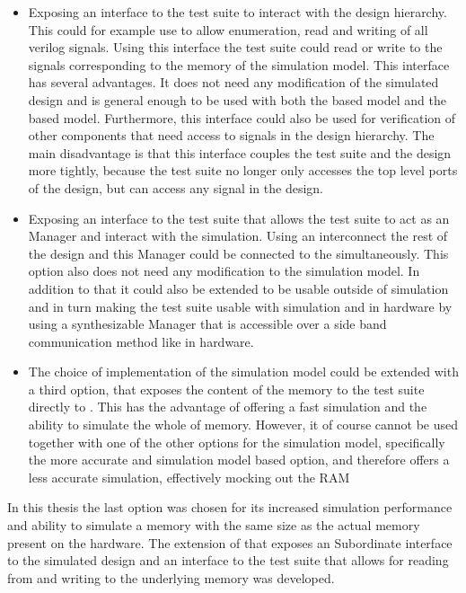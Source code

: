\begin{itemize}
  \item Exposing an interface to the test suite to interact with the design hierarchy. This could for example use \VPI{} to allow enumeration, read and writing of all verilog signals. Using this interface the test suite could read or write to the signals corresponding to the memory of the \DRAM{} simulation model. This interface has several advantages. It does not need any modification of the simulated design and is general enough to be used with both the \AXIBRAMController{} based model and the \MIG{} based model. Furthermore, this interface could also be used for verification of other components that need access to signals in the design hierarchy. The main disadvantage is that this interface couples the test suite and the \FPGA{} design more tightly, because the test suite no longer only accesses the top level ports of the design, but can access any signal in the \FPGA{} design.
  \item Exposing an interface to the test suite that allows the test suite to act as an \AXI{} Manager and interact with the simulation. Using an \AXI{} interconnect the rest of the \FPGA{} design and this \AXI{} Manager could be connected to the \AXI{} \DRAM{} simultaneously. This option also does not need any modification to the \AXI{} \DRAM{} simulation model. In addition to that it could also be extended to be usable outside of simulation and in turn making the test suite usable with simulation and in hardware by using a synthesizable \AXI{} Manager that is accessible over a side band communication method like \JTAG{} in hardware.
  \item The choice of implementation of the \AXI{} \DRAM{} simulation model could be extended with a third option, that exposes the content of the memory to the test suite directly to \flange{}. This has the advantage of offering a fast simulation and the ability to simulate the whole \DDRSIZE{} of memory. However, it of course cannot be used together with one of the other options for the \AXI{} \DRAM{} simulation model, specifically the more accurate \MIG{} and \DDR{} simulation model based option, and therefore offers a less accurate simulation, effectively mocking out the RAM
\end{itemize}
In this thesis the last option was chosen for its increased simulation performance and ability to simulate a memory with the same size as the actual memory present on the hardware. The \flangedram{} extension of \flange{} that exposes an \AXI{} Subordinate interface to the simulated \FPGA{} design and an interface to the test suite that allows for reading from and writing to the underlying memory was developed.
